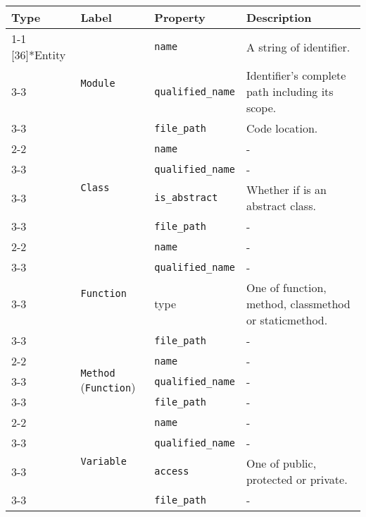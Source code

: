 \begin{tabularx}{\textwidth}{p{1.8cm}llX}
\toprule
\textbf{Type} & \textbf{Label} & \textbf{Property} & \textbf{Description} \\
\cmidrule{1-1}\cmidrule{2-2}\cmidrule{3-3}\cmidrule{4-4}
\multirow{18}[36]{*}{Entity} & \multirow{3}[6]{*}{\texttt{Module}} & \texttt{name} & A string of identifier. \\
\cmidrule{3-3}\cmidrule{4-4}
 &  & \texttt{qualified\_\texttt{name}} & Identifier's complete path including its scope. \\
\cmidrule{3-3}\cmidrule{4-4}
 &  & \texttt{file\_path} & Code location. \\
\cmidrule{2-2}\cmidrule{3-3}\cmidrule{4-4}
 & \multirow{4}[8]{*}{\texttt{Class}} & \texttt{name} & - \\
\cmidrule{3-3}\cmidrule{4-4}
 &  & \texttt{qualified\_\texttt{name}} & - \\
\cmidrule{3-3}\cmidrule{4-4}
 &  & \texttt{is\_abstract} & Whether if is an abstract class. \\
\cmidrule{3-3}\cmidrule{4-4}
 &  & \texttt{file\_path} & - \\
\cmidrule{2-2}\cmidrule{3-3}\cmidrule{4-4}
 & \multirow{4}[8]{*}{\texttt{Function}} & \texttt{name} & - \\
\cmidrule{3-3}\cmidrule{4-4}
 &  & \texttt{qualified\_\texttt{name}} & - \\
\cmidrule{3-3}\cmidrule{4-4}
 &  & type & One of function, method, classmethod or staticmethod. \\
\cmidrule{3-3}\cmidrule{4-4}
 &  & \texttt{file\_path} & - \\
\cmidrule{2-2}\cmidrule{3-3}\cmidrule{4-4}
 & \multirow{3}[6]{*}{\texttt{Method} (\texttt{Function})} & \texttt{name} & - \\
\cmidrule{3-3}\cmidrule{4-4}
 &  & \texttt{qualified\_\texttt{name}} & - \\
\cmidrule{3-3}\cmidrule{4-4}
 &  & \texttt{file\_path} & - \\
\cmidrule{2-2}\cmidrule{3-3}\cmidrule{4-4}
 & \multirow{4}[8]{*}{\texttt{Variable}} & \texttt{name} & - \\
\cmidrule{3-3}\cmidrule{4-4}
 &  & \texttt{qualified\_\texttt{name}} & - \\
\cmidrule{3-3}\cmidrule{4-4}
 &  & \texttt{access} & One of public, protected or private. \\
\cmidrule{3-3}\cmidrule{4-4}
 &  & \texttt{file\_path} & - \\
\bottomrule
\end{tabularx}

